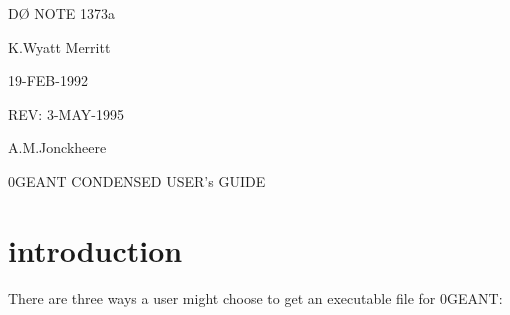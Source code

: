 %
%
%
%
%
%

%
\def\D0{D\O}
%

%
\begin{flushright}

\D0 NOTE 1373a

K.Wyatt Merritt

19-FEB-1992

REV: 3-MAY-1995

A.M.Jonckheere

\end{flushright}
\vspace{1.0in}
\centerline{\D0GEANT CONDENSED USER's GUIDE}

\begin{abstract}
This is a condensed guide to using \D0GEANT, with pointers to help the
new user avoid some common mistakes.  This guide is applicable to the Feb. 92
and subsequent releases, which will be using CERN version 3.14 and above.
For more detailed information on the operation of the program, see
the other \D0\$\D0GEANT:*.MEM files, particularly \D0GEANT\_USER.MEM.
\end{abstract}

\section{introduction}
\label{intro}

There are three ways a user might choose to get an executable file for
\D0GEANT:

